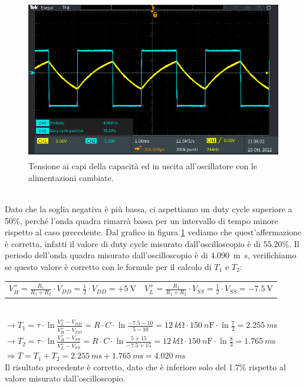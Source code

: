 \documentclass{report}
\begin{document}
\begin{figure}[h!]
	\centering
	\includegraphics[height=7cm]{immagini/TEK00032}
	\caption{Tensione ai capi della capacità ed in uscita all'oscillatore con le alimentazioni cambiate.}
	\label{figura:oscillo3_2}
\end{figure}
\\Dato che la soglia negativa è più bassa, ci aspettiamo un duty cycle superiore a 50\%, perché l'onda quadra rimarrà bassa per un intervallo di tempo minore rispetto al caso precedente. Dal grafico in figura \ref{figura:oscillo3_2} vediamo che quest'affermazione è corretta, infatti il valore di duty cycle misurato dall'oscilloscopio è di 55.20\%. Il periodo dell'onda quadra misurato dall'oscilloscopio è di \SI{4.090}{m\second}, verifichiamo se questo valore è corretto con le formule per il calcolo di $T_1$ e $T_2$:
\begin{table}[h!]
	\begin{tabular}{cc}
		\;\;\;$\displaystyle{V_H^+=\frac{R_1}{R_1+R_2}\cdot V_{DD}=\frac{1}{2}\cdot V_{DD}=+\SI{5}{\volt}}$\;\;\;\;\;\;\;\;\;\;\;\;\;\;\;\;\;\;\;\;\;\;\; & $\displaystyle{V_L^+=\frac{R_1}{R_1+R_2}\cdot V_{SS}=\frac{1}{2}\cdot V_{SS}=-\SI{7.5}{\volt}}$\\ 
	\end{tabular}
\end{table}
\\\indent$\rightarrow\displaystyle{T_1=\tau\cdot\ln\frac{V_L^+-V_{DD}}{V_H^+-V_{DD}}=R\cdot C\cdot\ln\frac{-7.5-10}{5-10}=\SI{12}{k\ohm}\cdot\SI{150}{n\farad}\cdot\ln\frac{7}{2}}=\SI{2.255}{m\second}$
\\[6pt]\indent$\rightarrow\displaystyle{T_2=\tau\cdot\ln\frac{V_H^+-V_{SS}}{V_L^+-V_{SS}}=R\cdot C\cdot\ln\frac{5+15}{-7.5+15}=\SI{12}{k\ohm}\cdot\SI{150}{n\farad}\cdot\ln\frac{8}{3}}=\SI{1.765}{m\second}$
\\[6pt]\indent$\Rightarrow\displaystyle{T=T_1+T_2=\SI{2.255}{m\second}+\SI{1.765}{m\second}=\SI{4.020}{m\second}}$
\\[2pt]Il risultato precedente è corretto, dato che è inferiore solo del 1.7\% rispetto al valore misurato dall'oscilloscopio.
\newpage
\end{document}
